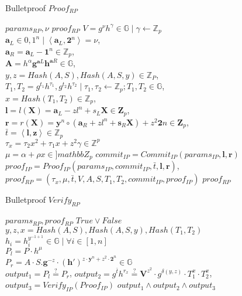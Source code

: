 \documentclass[UTF8]{article}
\begin{document}
\begin{appendices}
\begin{algorithm}[H]
  \caption{Bulletproof $Proof_{RP}$}
  \begin{algorithmic}
    \REQUIRE $params_{RP}, \nu$
    \ENSURE $proof_{RP}$
    \STATE $V=g^{\nu}h^{\gamma} \in \mathbb{G} \mid  \gamma \leftarrow \mathbb{Z}_p$\\
    $\mathbf{a}_L \in {0, 1}^n \mid \left< \mathbf{a}_L, \mathbf{2}^n \right> = \nu$,\\
    $\mathbf{a}_R = \mathbf{a}_L - \mathbf{1}^n \in \mathbb{Z}_p$, \\
    $\mathbf{A}=h^\alpha \mathbf{g}^{\mathbf{a}L} \mathbf{h}^{\mathbf{a}R} \in \mathbb{G}$,\\
    $y, z=Hash(A, S), Hash(A, S, y) \in \mathbb{Z}_P$,\\
    $T_1, T_2 = g^{t_1}h^{\tau_1}, g^{t_2}h^{\tau_2} \mid \tau_1, \tau_2 \leftarrow \mathbb{Z}_p; T_1, T_2 \in \mathbb{G}$,\\
    $x=Hash(T_1, T_2) \in \mathbb{Z}_p$,\\
    $\mathbf{l}=l(\mathbf{X})=\mathbf{a}_L-zl^n+s_L\mathbf{X} \in \mathbf{Z}_p$,\\
    $\mathbf{r}=r(\mathbf{X})=\mathbf{y}^n \circ (\mathbf{a}_R+zl^n+\mathbf{s}_R\mathbf{X}) + z^2\mathbf{2}n \in \mathbf{Z}_p$,\\
    $\bar{t}=\left< \mathbf{l}, \mathbf{z}\right> \in \mathbb{Z}_p$\\
    $\tau_x=\tau_2x^2+\tau_1x+z^2\gamma \in \mathbb{Z}^p$\\
    $\mu=\alpha + \rho x \in ]mathbb{Z}_p$
    \STATE $commit_{IP}=Commit_{IP}(params_{IP}, \mathbf{l}, \mathbf{r})$
    \STATE $proof_{IP}=Proof_{IP}(params_{IP}, commit_{IP}, \bar{t}, \mathbf{l}, \mathbf{r})$,
    \STATE $proof_{RP}=(\tau_x, \mu, \bar{t}, V, A, S, T_1, T_2, commit_{IP}, proof_{IP})$
    \RETURN $proof_{RP}$
\end{algorithmic}
\end{algorithm}


\begin{algorithm}[H]
  \caption{Bulletproof $Verify_{RP}$}
  \begin{algorithmic}
    \REQUIRE $params_{RP}, proof_{RP}$
    \ENSURE $True \vee False$
    \STATE $y,z,x=Hash(A, S), Hash(A, S,y), Hash(T_1, T_2)$\\
    $h_i=h_i^{y^{-1+1}} \in  \mathbb{G} \mid \forall i \in [1, n]$\\
    $P_l=P\cdot h^\mu$\\
    $P_r=A\cdot S .\mathbf{g}^{-z}\cdot (\mathbf{h}')^{z\cdot \mathbf{y}^n+z^2\cdot\mathbf{2}^n} \in \mathbb{G}$\\
    \STATE $output_1 = P_l \stackrel{?}{=} P_r$,
    \STATE $output_2 = g^{\bar{t}}h^{r_x} \stackrel{?}{=} \mathbf{V}^{z^2}\cdot g^{\delta(y,z)}\cdot T_1^x\cdot T_2^x$,
    \STATE $output_3 = Verify_{IP}(Proof_{IP})$
    \RETURN $output_1 \wedge output_2 \wedge output_3$
\end{algorithmic}
\end{algorithm}


\end{appendices}
\end{document}
